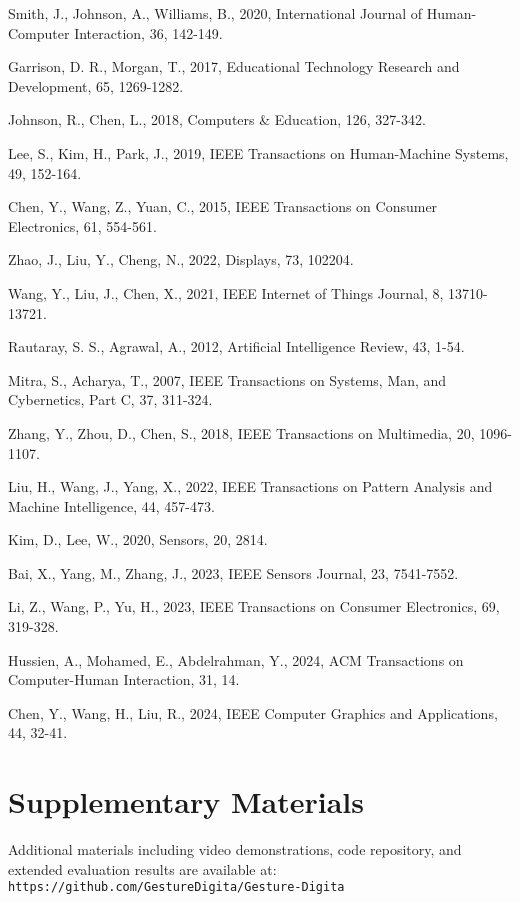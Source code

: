 \documentclass[arxiv,usenatbib]{iupartex}
\begin{document}
\begin{thebibliography}{}
Smith, J., Johnson, A., Williams, B., 2020, International Journal of Human-Computer Interaction, 36, 142-149. 

Garrison, D. R., Morgan, T., 2017, Educational Technology Research and Development, 65, 1269-1282.

Johnson, R., Chen, L., 2018, Computers \& Education, 126, 327-342.

Lee, S., Kim, H., Park, J., 2019, IEEE Transactions on Human-Machine Systems, 49, 152-164.

Chen, Y., Wang, Z., Yuan, C., 2015, IEEE Transactions on Consumer Electronics, 61, 554-561.

Zhao, J., Liu, Y., Cheng, N., 2022, Displays, 73, 102204.

Wang, Y., Liu, J., Chen, X., 2021, IEEE Internet of Things Journal, 8, 13710-13721.

Rautaray, S. S., Agrawal, A., 2012, Artificial Intelligence Review, 43, 1-54.

Mitra, S., Acharya, T., 2007, IEEE Transactions on Systems, Man, and Cybernetics, Part C, 37, 311-324.

Zhang, Y., Zhou, D., Chen, S., 2018, IEEE Transactions on Multimedia, 20, 1096-1107.

Liu, H., Wang, J., Yang, X., 2022, IEEE Transactions on Pattern Analysis and Machine Intelligence, 44, 457-473.

Kim, D., Lee, W., 2020, Sensors, 20, 2814.

Bai, X., Yang, M., Zhang, J., 2023, IEEE Sensors Journal, 23, 7541-7552.

Li, Z., Wang, P., Yu, H., 2023, IEEE Transactions on Consumer Electronics, 69, 319-328.

Hussien, A., Mohamed, E., Abdelrahman, Y., 2024, ACM Transactions on Computer-Human Interaction, 31, 14.

Chen, Y., Wang, H., Liu, R., 2024, IEEE Computer Graphics and Applications, 44, 32-41.

\end{thebibliography}

\section*{Supplementary Materials}
Additional materials including video demonstrations, code repository, and extended evaluation results are available at: \texttt{https://github.com/GestureDigita/Gesture-Digita}

\bsp	%
\label{lastpage}
\end{document}
